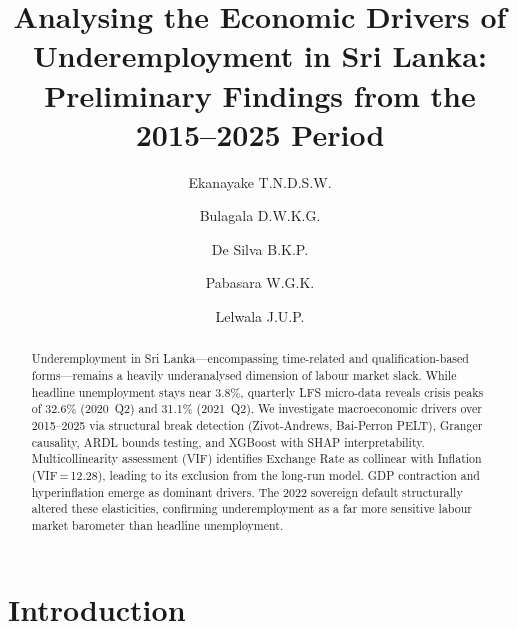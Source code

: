 \documentclass[sigconf]{acmart}
\begin{document}
\title{Analysing the Economic Drivers of Underemployment in Sri Lanka: Preliminary Findings from the 2015--2025 Period}

\author{Ekanayake T.N.D.S.W.}

\author{Bulagala D.W.K.G.}

\author{De Silva B.K.P.}

\author{Pabasara W.G.K.}

\author{Lelwala J.U.P.}

\begin{abstract}
Underemployment in Sri Lanka---encompassing time-related and qualification-based forms---remains a heavily underanalysed dimension of labour market slack. While headline unemployment stays near 3.8\%, quarterly LFS micro-data reveals crisis peaks of 32.6\% (2020~Q2) and 31.1\% (2021~Q2). We investigate macroeconomic drivers over 2015--2025 via structural break detection (Zivot-Andrews, Bai-Perron PELT), Granger causality, ARDL bounds testing, and XGBoost with SHAP interpretability. Multicollinearity assessment (VIF) identifies Exchange Rate as collinear with Inflation (VIF\,=\,12.28), leading to its exclusion from the long-run model. GDP contraction and hyperinflation emerge as dominant drivers. The 2022 sovereign default structurally altered these elasticities, confirming underemployment as a far more sensitive labour market barometer than headline unemployment.
\end{abstract}


\maketitle

\section{Introduction}
\end{document}

